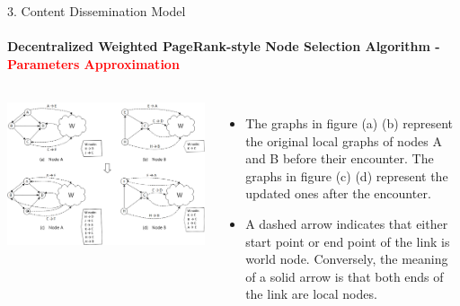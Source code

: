 \documentclass{beamer}		%
\begin{document}
\begin{frame}{3. Content Dissemination Model}
\framesubtitle{Decentralized Weighted PageRank-style Node Selection Algorithm - \textcolor{red}{Parameters Approximation}}
\begin{columns}
\includegraphics[scale=0.048]{imgs/Fig3.png}
\begin{itemize}
    \item The graphs in figure (a) (b) represent the original local graphs of nodes A and B before their encounter. The graphs in figure (c) (d) represent the updated ones after the encounter. 
    \item A dashed arrow indicates that either start point or end point of the link is world node. Conversely, the meaning of a solid arrow is that both ends of the link are local nodes.
\end{itemize}
\end{columns}
\end{frame}
\end{document}
